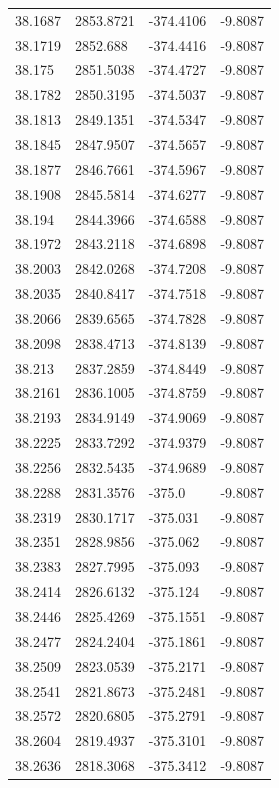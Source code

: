 \begin{table}[H]
\begin{tabular}{llll}
38.1687 & 2853.8721 & -374.4106 & -9.8087 \\
38.1719 & 2852.688 & -374.4416 & -9.8087 \\
38.175 & 2851.5038 & -374.4727 & -9.8087 \\
38.1782 & 2850.3195 & -374.5037 & -9.8087 \\
38.1813 & 2849.1351 & -374.5347 & -9.8087 \\
38.1845 & 2847.9507 & -374.5657 & -9.8087 \\
38.1877 & 2846.7661 & -374.5967 & -9.8087 \\
38.1908 & 2845.5814 & -374.6277 & -9.8087 \\
38.194 & 2844.3966 & -374.6588 & -9.8087 \\
38.1972 & 2843.2118 & -374.6898 & -9.8087 \\
38.2003 & 2842.0268 & -374.7208 & -9.8087 \\
38.2035 & 2840.8417 & -374.7518 & -9.8087 \\
38.2066 & 2839.6565 & -374.7828 & -9.8087 \\
38.2098 & 2838.4713 & -374.8139 & -9.8087 \\
38.213 & 2837.2859 & -374.8449 & -9.8087 \\
38.2161 & 2836.1005 & -374.8759 & -9.8087 \\
38.2193 & 2834.9149 & -374.9069 & -9.8087 \\
38.2225 & 2833.7292 & -374.9379 & -9.8087 \\
38.2256 & 2832.5435 & -374.9689 & -9.8087 \\
38.2288 & 2831.3576 & -375.0 & -9.8087 \\
38.2319 & 2830.1717 & -375.031 & -9.8087 \\
38.2351 & 2828.9856 & -375.062 & -9.8087 \\
38.2383 & 2827.7995 & -375.093 & -9.8087 \\
38.2414 & 2826.6132 & -375.124 & -9.8087 \\
38.2446 & 2825.4269 & -375.1551 & -9.8087 \\
38.2477 & 2824.2404 & -375.1861 & -9.8087 \\
38.2509 & 2823.0539 & -375.2171 & -9.8087 \\
38.2541 & 2821.8673 & -375.2481 & -9.8087 \\
38.2572 & 2820.6805 & -375.2791 & -9.8087 \\
38.2604 & 2819.4937 & -375.3101 & -9.8087 \\
38.2636 & 2818.3068 & -375.3412 & -9.8087 \\

\end{tabular}
\end{table}
